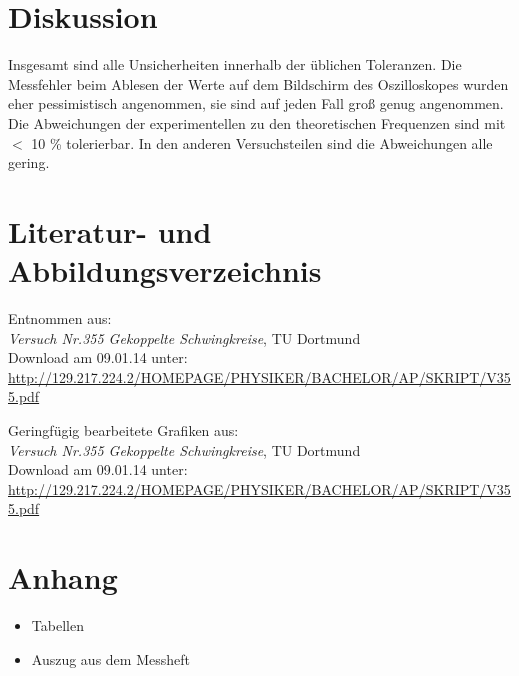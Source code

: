 \documentclass[11pt,ngerman,a4paper]{article}
\begin{document}
\section{Diskussion}
Insgesamt sind alle Unsicherheiten innerhalb der üblichen Toleranzen. Die Messfehler beim Ablesen der Werte auf dem Bildschirm des Oszilloskopes wurden eher pessimistisch angenommen, sie sind auf jeden Fall groß genug angenommen. Die Abweichungen der experimentellen zu den theoretischen Frequenzen sind mit $<$ 10 \% tolerierbar.\newline
In den anderen Versuchsteilen sind die Abweichungen alle gering.

\section{Literatur- und Abbildungsverzeichnis}
\begin{enumerate}[{[}1{]}]
\item Entnommen aus: \\\textit{Versuch Nr.355 Gekoppelte Schwingkreise}, TU Dortmund\\
Download am 09.01.14 unter:\\
\url{http://129.217.224.2/HOMEPAGE/PHYSIKER/BACHELOR/AP/SKRIPT/V355.pdf}
\item Geringfügig bearbeitete Grafiken aus:\\ \textit{Versuch Nr.355 Gekoppelte Schwingkreise}, TU Dortmund\\
Download am 09.01.14 unter:\\
\url{http://129.217.224.2/HOMEPAGE/PHYSIKER/BACHELOR/AP/SKRIPT/V355.pdf}
\end{enumerate}
\section{Anhang}
\begin{itemize}
\item Tabellen
\item Auszug aus dem Messheft
\end{itemize}
\end{document}
